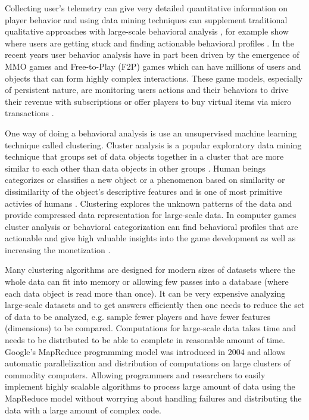 Collecting user's telemetry can give very detailed quantitative information on player behavior and using data mining techniques can supplement traditional qualitative approaches with large-scale behavioral analysis \citep{Yannakakis:2012}, for example show where users are getting stuck and finding actionable behavioral profiles \citep{Kim:2008Tracking, Drachen:2012, Drachen:2011Evaluating}. In the recent years user behavior analysis have in part been driven by the emergence of MMO games and Free-to-Play (F2P) games which can have millions of users and objects that can form highly complex interactions. These game models, especially of persistent nature, are monitoring users actions and their behaviors to drive their revenue with subscriptions or offer players to buy virtual items via micro transactions \citep{Kim:2008Tracking, Drachen:2011Evaluating, Fields:2011SocialGame, Seif:2013GameAnalytics}. 

One way of doing a behavioral analysis is use an unsupervised machine learning technique called clustering. Cluster analysis is a popular exploratory data mining technique that groups set of data objects together in a cluster that are more similar to each other than data objects in other groups \citep{Xu:2005Clustering}. Human beings categorizes or classifies a new object or a phenomenon based on similarity or dissimilarity of the object's descriptive features and is one of most primitive activies of humans \citep{Anderberg:1973ClusterAnalysis}. Clustering explores the unknown patterns of the data and provide compressed data representation for large-scale data. In computer games cluster analysis or behavioral categorization can find behavioral profiles that are actionable and give high valuable insights into the game development as well as increasing the monetization \cite{Drachen:2009Tomb, Mahlmann:2010Tomb}. 

Many clustering algorithms are designed for modern sizes of datasets where the whole data can fit into memory or allowing few passes into a database (where each data object is read more than once). It can be very expensive analyzing large-scale datasets and to get answers efficiently then one needs to reduce the set of data to be analyzed, e.g. sample fewer players and have fewer features (dimensions) to be compared. Computations for large-scale data takes time and needs to be distributed to be able to complete in reasonable amount of time. Google's MapReduce programming model was introduced in 2004 \citep{Dean:2004} and allows automatic parallelization and distribution of computations on large clusters of commodity computers. Allowing programmers and researchers to easily implement highly scalable algorithms to process large amount of data using the MapReduce model without worrying about handling failures and distributing the data with a large amount of complex code. 

